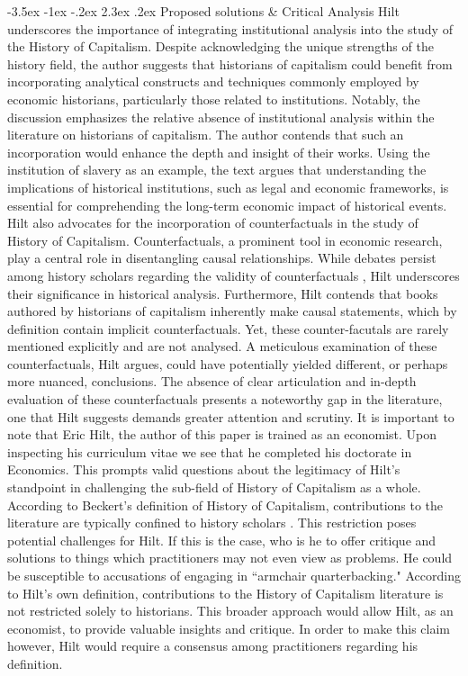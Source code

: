 \documentclass[11pt]{article}
\makeatletter
\newcommand{\bb}{\bigbreak\noindent}
\renewcommand\section{\leftskip 0pt\@startsection {section}{1}{\z@}%
	{-3.5ex \@plus -1ex \@minus -.2ex}%
	{2.3ex \@plus.2ex}%
	{\normalfont\Large\bfseries}}
\makeatother
\begin{document}
\begin{spacing}{1.7}
		\section{Proposed solutions \& Critical Analysis}
		Hilt underscores the importance of integrating institutional analysis into the study of the History of Capitalism. Despite acknowledging the unique strengths of the history field, the author suggests that historians of capitalism could benefit from incorporating analytical constructs and techniques commonly employed by economic historians, particularly those related to institutions. Notably, the discussion emphasizes the relative absence of institutional analysis within the literature on historians of capitalism. The author contends that such an incorporation would enhance the depth and insight of their works. Using the institution of slavery as an example, the text argues that understanding the implications of historical institutions, such as legal and economic frameworks, is essential for comprehending the long-term economic impact of historical events.
		\bb
		Hilt also advocates for the incorporation of counterfactuals in the study of History of Capitalism. Counterfactuals, a prominent tool in economic research, play a central role in disentangling causal relationships. While debates persist among history scholars regarding the validity of counterfactuals \parencite{evans2014altered}, Hilt underscores their significance in historical analysis. Furthermore, Hilt contends that books authored by historians of capitalism inherently make causal statements, which by definition contain implicit counterfactuals. Yet, these counter-facutals are rarely mentioned explicitly and are not analysed. A meticulous examination of these counterfactuals, Hilt argues, could have potentially yielded different, or perhaps more nuanced, conclusions. The absence of clear articulation and in-depth evaluation of these counterfactuals presents a noteworthy gap in the literature, one that Hilt suggests demands greater attention and scrutiny.
		\bb
		It is important to note that Eric Hilt, the author of this paper is trained as an economist. Upon inspecting his curriculum vitae we see that he completed his doctorate in Economics. This prompts valid questions about the legitimacy of Hilt's standpoint in challenging the sub-field of History of Capitalism as a whole. According to Beckert's definition of History of Capitalism, contributions to the literature are typically confined to history scholars \parencite{beckert2012history}. This restriction poses potential challenges for Hilt. If this is the case, who is he to offer critique and solutions to things which practitioners may not even view as problems. He could be susceptible to accusations of engaging in ``armchair quarterbacking." According to Hilt's own definition, contributions to the History of Capitalism literature is not restricted solely to historians. This broader approach would allow Hilt, as an economist, to provide valuable insights and critique. In order to make this claim however, Hilt would require a consensus among practitioners regarding his definition. 

\end{spacing}
\end{document}
